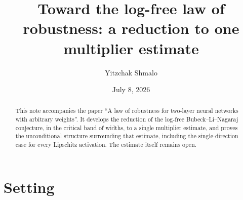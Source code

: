 \documentclass[11pt,reqno]{amsart}
\title[Toward the log-free law of robustness]{Toward the log-free law of robustness: a reduction to one multiplier estimate}
\author{Yitzchak Shmalo}
\date{July 8, 2026}
\theoremstyle{plain}
\theoremstyle{definition}
\theoremstyle{remark}
\begin{document}
\begin{abstract}
This note accompanies the paper ``A law of robustness for two-layer neural networks with arbitrary weights''. It develops the reduction of the log-free Bubeck--Li--Nagaraj conjecture, in the critical band of widths, to a single multiplier estimate, and proves the unconditional structure surrounding that estimate, including the single-direction case for every Lipschitz activation. The estimate itself remains open.
\end{abstract}

\maketitle

\section{Setting}\label{sec:setting}
\end{document}
